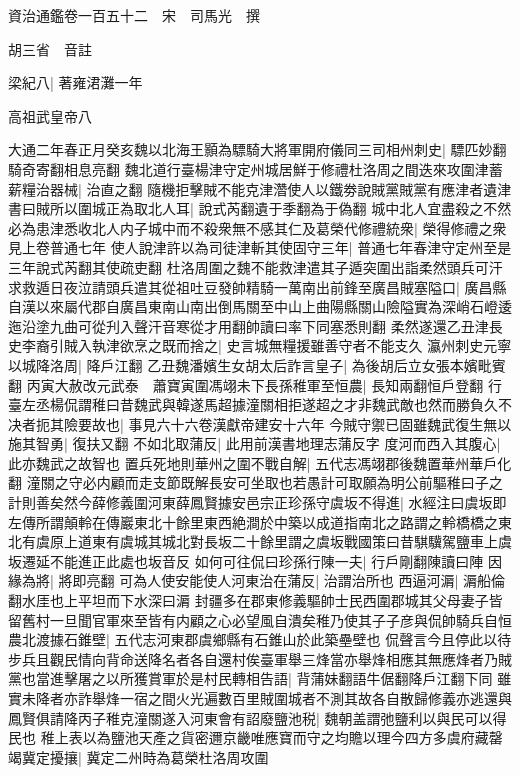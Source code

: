 資治通鑑卷一百五十二　宋　司馬光　撰

胡三省　音註

梁紀八|{
	著雍涒灘一年}


高祖武皇帝八

大通二年春正月癸亥魏以北海王顥為驃騎大將軍開府儀同三司相州刺史|{
	驃匹妙翻騎奇寄翻相息亮翻}
魏北道行臺楊津守定州城居鮮于修禮杜洛周之間迭來攻圍津蓄薪糧治器械|{
	治直之翻}
隨機拒擊賊不能克津濳使人以鐵劵說賊黨賊黨有應津者遺津書曰賊所以圍城正為取北人耳|{
	說式芮翻遺于季翻為于偽翻}
城中北人宜盡殺之不然必為患津悉收北人内子城中而不殺衆無不感其仁及葛榮代修禮統衆|{
	榮得修禮之衆見上卷普通七年}
使人說津許以為司徒津斬其使固守三年|{
	普通七年春津守定州至是三年說式芮翻其使疏吏翻}
杜洛周圍之魏不能救津遣其子遁突圍出詣柔然頭兵可汗求救遁日夜泣請頭兵遣其從祖吐豆發帥精騎一萬南出前鋒至廣昌賊塞隘口|{
	廣昌縣自漢以來屬代郡自廣昌東南山南出倒馬關至中山上曲陽縣關山險隘實為深峭石嶝逶迤沿塗九曲可從刋入聲汗音寒從才用翻帥讀曰率下同塞悉則翻}
柔然遂還乙丑津長史李裔引賊入執津欲烹之既而捨之|{
	史言城無糧援雖善守者不能支久}
瀛州刺史元寧以城降洛周|{
	降戶江翻}
乙丑魏潘嬪生女胡太后詐言皇子|{
	為後胡后立女張本嬪毗賓翻}
丙寅大赦改元武泰　蕭寶寅圍馮翊未下長孫稚軍至恒農|{
	長知兩翻恒戶登翻}
行臺左丞楊侃謂稚曰昔魏武與韓遂馬超據潼關相拒遂超之才非魏武敵也然而勝負久不决者扼其險要故也|{
	事見六十六卷漢獻帝建安十六年}
今賊守禦已固雖魏武復生無以施其智勇|{
	復扶又翻}
不如北取蒲反|{
	此用前漢書地理志蒲反字}
度河而西入其腹心|{
	此亦魏武之故智也}
置兵死地則華州之圍不戰自解|{
	五代志馮翊郡後魏置華州華戶化翻}
潼關之守必内顧而走支節既解長安可坐取也若愚計可取願為明公前驅稚曰子之計則善矣然今薛修義圍河東薛鳳賢據安邑宗正珍孫守虞坂不得進|{
	水經注曰虞坂即左傳所謂顛軨在傳巖東北十餘里東西絶澗於中築以成道指南北之路謂之軨橋橋之東北有虞原上道東有虞城其城北對長坂二十餘里謂之虞坂戰國策曰昔騏驥駕鹽車上虞坂遷延不能進正此處也坂音反}
如何可往侃曰珍孫行陳一夫|{
	行戶剛翻陳讀曰陣}
因緣為將|{
	將即亮翻}
可為人使安能使人河東治在蒲反|{
	治謂治所也}
西逼河漘|{
	漘船倫翻水厓也上平坦而下水深曰漘}
封疆多在郡東修義驅帥士民西圍郡城其父母妻子皆留舊村一旦聞官軍來至皆有内顧之心必望風自潰矣稚乃使其子子彦與侃帥騎兵自恒農北渡據石錐壁|{
	五代志河東郡虞鄉縣有石錐山於此築壘壁也}
侃聲言今且停此以待步兵且觀民情向背命送降名者各自還村俟臺軍舉三烽當亦舉烽相應其無應烽者乃賊黨也當進擊屠之以所獲賞軍於是村民轉相告語|{
	背蒲妹翻語牛倨翻降戶江翻下同}
雖實未降者亦詐舉烽一宿之間火光遍數百里賊圍城者不測其故各自散歸修義亦逃還與鳳賢俱請降丙子稚克潼關遂入河東會有詔廢鹽池税|{
	魏朝盖謂弛鹽利以與民可以得民也}
稚上表以為鹽池天產之貨密邇京畿唯應寶而守之均贍以理今四方多虞府藏罄竭冀定擾攘|{
	冀定二州時為葛榮杜洛周攻圍}
